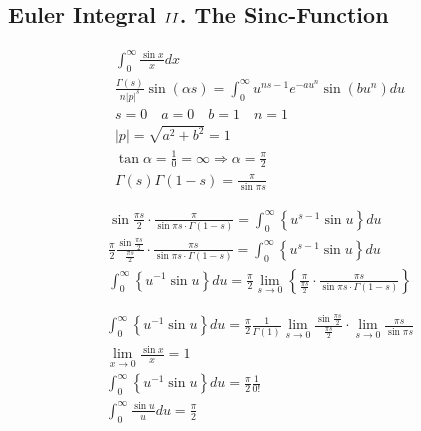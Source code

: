 	\subsection{Euler Integral $\RNumb{2}$. The Sinc-Function}
	
	$$
	\begin{gathered}
		\int_0^{\infty} \frac{\sin x}{x} d x \\
		\frac{\Gamma(s)}{n|p|^s} \sin (\alpha s)=\int_0^{\infty} u^{n s-1} e^{-a u^n} \sin \left(b u^n\right) d u \\
		s=0 \quad a=0 \quad b=1 \quad n=1 \\
		|p|=\sqrt{a^2+b^2}=1 \\
		\tan \alpha=\frac{1}{0}=\infty \Rightarrow \alpha=\frac{\pi}{2} \\
		\Gamma(s) \Gamma(1-s)=\frac{\pi}{\sin \pi s}
	\end{gathered}
	$$
	
	$$
	\begin{gathered}
		\sin \frac{\pi s}{2} \cdot \frac{\pi}{\sin \pi s \cdot \Gamma(1-s)}=\int_0^{\infty}\left\{u^{s-1} \sin u\right\} d u \\
		\frac{\pi}{2} \frac{\sin \frac{\pi s}{2}}{\frac{\pi s}{2}} \cdot \frac{\pi s}{\sin \pi s \cdot \Gamma(1-s)}=\int_0^{\infty}\left\{u^{s-1} \sin u\right\} d u \\
		\int_0^{\infty}\left\{u^{-1} \sin u\right\} d u=\frac{\pi}{2} \lim _{s \rightarrow 0}\left\{\frac{\pi}{\frac{\pi s}{2}} \cdot \frac{\pi s}{\sin \pi s \cdot \Gamma(1-s)}\right\}
	\end{gathered}
	$$
	
	$$
	\begin{gathered}
		\int_0^{\infty}\left\{u^{-1} \sin u\right\} d u=\frac{\pi}{2} \frac{1}{\Gamma(1)} \lim _{s \rightarrow 0} \frac{\sin \frac{\pi s}{2}}{\frac{\pi s}{2}} \cdot \lim _{s \rightarrow 0} \frac{\pi s}{\sin \pi s} \\
		\lim _{x \rightarrow 0} \frac{\sin x}{x}=1 \\
		\int_0^{\infty}\left\{u^{-1} \sin u\right\} d u=\frac{\pi}{2} \frac{1}{0 !} \\
		\int_0^{\infty} \frac{\sin u}{u} d u=\frac{\pi}{2}
	\end{gathered}
	$$
	
